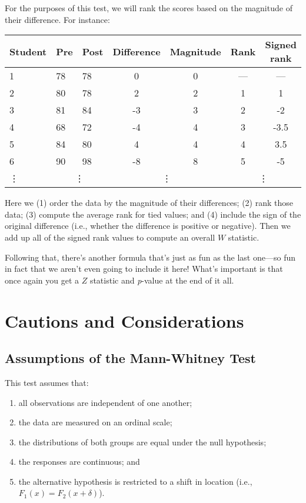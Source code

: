 For the purposes of this test, we will rank the scores based on the magnitude of their difference. For instance:

\begin{tabular}{l l l | c c c c}
Student & Pre & Post & Difference & Magnitude & Rank & Signed rank \\
\hline
1 & 78 & 78 & 0 & 0 & --- & --- \\
2 & 80 & 78 & 2 & 2 & 1 & 1 \\
3 & 81 & 84 & -3 & 3 & 2 & -2 \\
4 & 68 & 72 & -4 & 4 & 3 & -3.5 \\
5 & 84 & 80 & 4 & 4 & 4 & 3.5 \\
6 & 90 & 98 & -8 & 8 & 5 & -5 \\
\vdots & \multicolumn{2}{c}{\vdots} & \multicolumn{2}{c}{\vdots} & \multicolumn{2}{c}{\vdots} \\
\end{tabular}

Here we (1) order the data by the magnitude of their differences; (2) rank those data; (3) compute the average rank for tied values; and (4) include the sign of the original difference (i.e., whether the difference is positive or negative). Then we add up all of the signed rank values  to compute  an  overall  $W$  statistic.

Following  that,  there's  another  formula that's  just  as  fun  as the  last  one---so  fun in fact that we aren't even going to include  it here!  What's important  is that once again you get a $Z$ statistic and \textit{p}-value at the  end of  it  all.

\section{Cautions and Considerations}

\subsection{Assumptions of the Mann-Whitney Test}

This test assumes that:
\begin{enumerate}
\item all observations are independent of one another;
\item the data are measured on an ordinal scale;
\item the distributions of both groups are equal under the null hypothesis;
\item the responses are continuous; and
\item the alternative hypothesis is restricted to a shift in location (i.e., $F_1(x)=F_2(x+\delta)$).
\end{enumerate}

